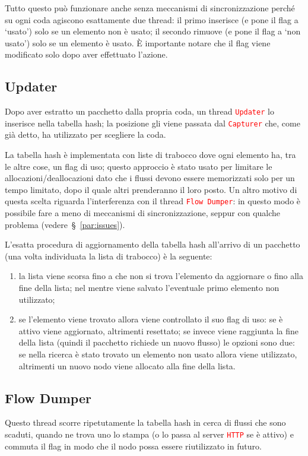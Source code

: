 \documentclass[a4paper,11pt]{article}
\newcommand\code[1]{\textcolor{red}{\texttt{#1}}}
\begin{document}
Tutto questo può funzionare anche senza meccanismi di sincronizzazione
perché su ogni coda agiscono esattamente due thread: il primo
inserisce (e pone il flag a `usato') solo se un elemento non è usato;
il secondo rimuove (e pone il flag a `non usato') solo se un elemento
è usato. \`E importante notare che il flag viene modificato solo dopo
aver effettuato l'azione.

\subsection{Updater}
Dopo aver estratto un pacchetto dalla propria coda, un thread
\code{Updater} lo inserisce nella tabella hash; la posizione gli viene
passata dal \code{Capturer} che, come già detto, ha utilizzato per
scegliere la coda.

La tabella hash è implementata con liste di trabocco dove ogni
elemento ha, tra le altre cose, un flag di uso; questo approccio è
stato usato per limitare le allocazioni/deallocazioni dato che i
flussi devono essere memorizzati solo per un tempo limitato, dopo il
quale altri prenderanno il loro posto. Un altro motivo di questa
scelta riguarda l'interferenza con il thread \code{Flow~Dumper}: in
questo modo è possibile fare a meno di meccanismi di sincronizzazione,
seppur con qualche problema (vedere~§~\ref{par:issues}).

L'esatta procedura di aggiornamento della tabella hash all'arrivo di
un pacchetto (una volta individuata la lista di trabocco) è la
seguente:

\begin{enumerate}
\item la lista viene scorsa fino a che non si trova l'elemento da
  aggiornare o fino alla fine della lista; nel mentre viene salvato
  l'eventuale primo elemento non utilizzato;
\item se l'elemento viene trovato allora viene controllato il suo flag
  di uso: se è attivo viene aggiornato, altrimenti resettato; se
  invece viene raggiunta la fine della lista (quindi il pacchetto
  richiede un nuovo flusso) le opzioni sono due: se nella ricerca è
  stato trovato un elemento non usato allora viene utilizzato,
  altrimenti un nuovo nodo viene allocato alla fine della lista.
\end{enumerate}

\subsection{Flow Dumper}
Questo thread scorre ripetutamente la tabella hash in cerca di flussi
che sono scaduti, quando ne trova uno lo stampa (o lo passa al server
\code{HTTP} se è attivo) e commuta il flag in modo che il nodo possa
essere riutilizzato in futuro.
\end{document}
